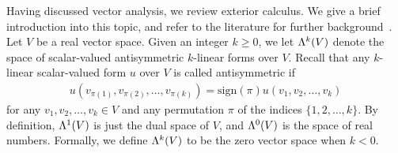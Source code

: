\documentclass[10pt,letterpaper]{article}
\begin{document}
Having discussed vector analysis, we review exterior calculus. 
We give a brief introduction into this topic, and refer to the literature for further background~\cite{lee2012smooth}. 
Let $V$ be a real vector space. 
Given an integer $k \geq 0$, we let $\Lambda^{k}(V)$ denote the space of scalar-valued antisymmetric $k$-linear forms over $V$. 
Recall that any $k$-linear scalar-valued form $u$ over $V$ is called antisymmetric
if 
\begin{gather*} 
    u( v_{\pi(1)}, v_{\pi(2)}, \ldots, v_{\pi(k)} ) 
    = 
    \text{sign}(\pi) 
    u( v_1, v_2, \ldots, v_k ) 
\end{gather*}
for any $v_1, v_2, \dots, v_k \in V$ and any permutation $\pi$ of the indices \(\{1, 2, \ldots, k\}\). 
By definition, $\Lambda^{1}(V)$ is just the dual space of $V$, and $\Lambda^{0}(V)$ is the space of real numbers. 
Formally, we define $\Lambda^{k}(V)$ to be the zero vector space when $k < 0$. 
\end{document}
